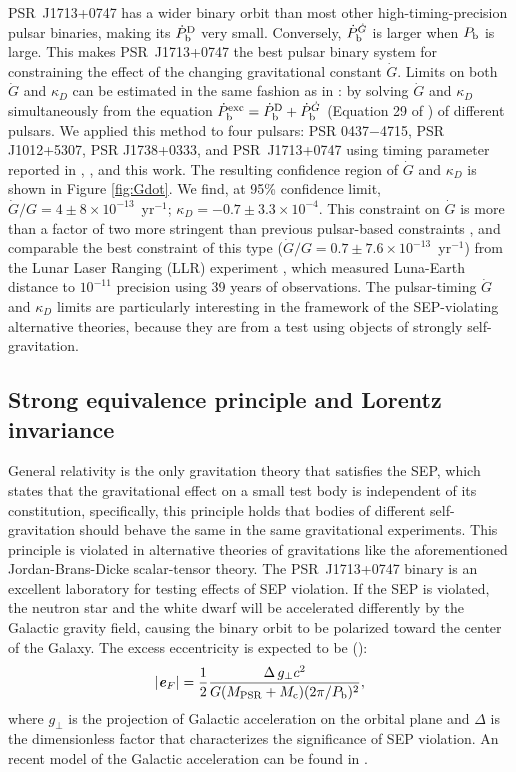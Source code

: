 PSR~J1713+0747 has a wider binary orbit than most other
high-timing-precision pulsar binaries, making its $\dot{P}_{\rm b}^{\rm D}$
very small. Conversely, $\dot{P}_{\rm b}^{\dot{G}}$ is larger when $P_{\rm b}$
is large. This makes PSR~J1713+0747 the best pulsar binary system for constraining
the effect of the changing gravitational constant $\dot{G}$. Limits 
on both $\dot{G}$ and $\kappa_D$ can be estimated in the same fashion as in
\citet{lwj+09}: by solving $\dot{G}$ and $\kappa_D$ simultaneously 
from the equation $\dot{P}_{\rm b}^{\rm exc} = \dot{P}_{\rm b}^{\rm D} +
\dot{P}_{\rm b}^{\dot{G}}$ (Equation 29 of \citealt{lwj+09}) of different
pulsars. We applied this method to four pulsars: PSR 0437$-$4715, PSR J1012+5307, PSR
J1738+0333, and PSR~J1713+0747 using timing parameter reported in
\citet{lwj+09}, \citet{fwe+12}, and this work.
The resulting confidence region of $\dot{G}$ and $\kappa_D$ is shown in Figure
\ref{fig:Gdot}.
We find, at 95\% confidence limit, $\dot{G}/G =
4\pm8\times10^{-13}$~yr$^{-1}$; $\kappa_D=-0.7\pm3.3\times10^{-4}$. 
This constraint on $\dot{G}$ is more than a factor of two more stringent than
previous pulsar-based constraints \citep{fwe+12}, and comparable
the best constraint of this type
($\dot{G}/G=0.7\pm7.6\times10^{-13}$~yr$^{-1}$) from the Lunar Laser Ranging
(LLR)
experiment \citep{hmb10}, which measured Luna-Earth distance to $10^{-11}$
precision using 39 years of observations.
The pulsar-timing $\dot{G}$ and $\kappa_D$ limits are particularly interesting 
in the framework of the SEP-violating alternative theories, because they are from 
a test using objects of strongly self-gravitation.

\subsection{Strong equivalence principle and Lorentz invariance}
\label{sec:sep}
General relativity is the only gravitation theory that satisfies
the SEP, which states that the gravitational
effect on a small test body is independent of its constitution, specifically,
this principle holds that bodies of different self-gravitation should behave the same in
the same gravitational experiments. This principle is violated in alternative
theories of gravitations like the aforementioned Jordan-Brans-Dicke
scalar-tensor theory. The PSR~J1713+0747 binary is an excellent laboratory for testing 
effects of SEP violation. If the SEP is violated, the neutron star and the white
dwarf will be accelerated differently by the Galactic gravity field, causing
the binary orbit to be polarized toward the center of the Galaxy. The excess 
eccentricity is expected to be (\citealt{ds91}):
\begin{equation}
|\textbf{\textit{e}}_F| = \frac{1}{2}\frac{\Delta\, g_{\bot}
  c^2}{G(M_{\rm PSR}+M_{\rm
c})(2\pi/P_{\rm b})^2},
\end{equation}
where $g_{\bot}$ is the projection of Galactic acceleration on the orbital plane 
and $\Delta$ is the dimensionless factor that characterizes the significance 
of SEP violation. An recent model of the Galactic acceleration can be found in
\citealt{hf04a}.

